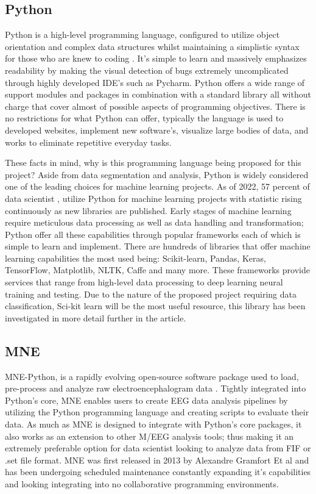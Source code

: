 \documentclass[12pt]{article}
\begin{document}
\subsection{Python}
Python is a high-level programming language, configured to utilize object orientation and complex data structures whilst maintaining a simplistic syntax for those who are knew to coding \cite{van1995python}. It's simple to learn and massively emphasizes readability by making the visual detection of bugs extremely uncomplicated through highly developed IDE's such as Pycharm. Python offers a wide range of support modules and packages in combination with a standard library all without charge that cover almost of possible aspects of programming objectives. There is no restrictions for what Python can offer, typically the language is used to developed websites, implement new software's, visualize large bodies of data, and works to eliminate repetitive everyday tasks. 

These facts in mind, why is this programming language being proposed for this project? Aside from data segmentation and analysis, Python is widely considered one of the leading choices for machine learning projects. As of 2022, 57 percent of data scientist \cite{coursera_2021}, utilize Python for machine learning projects with statistic rising continuously as new libraries are published. Early stages of machine learning require meticulous data processing as well as data handling and transformation; Python offer all these capabilities through popular frameworks each of which is simple to learn and implement. There are hundreds of libraries that offer machine learning capabilities the most used being: Scikit-learn, Pandas, Keras, TensorFlow, Matplotlib, NLTK, Caffe and many more. These frameworks provide services that range from high-level data processing to deep learning neural training and testing. Due to the nature of the proposed project requiring data classification, Sci-kit learn will be the most useful resource, this library has been investigated in more detail further in the article.

\subsection{MNE}
MNE-Python, is a rapidly evolving open-source software package used to load, pre-process and analyze raw electroencephalogram data \cite{GramfortEtAl2013a}. Tightly integrated into Python's core, MNE enables users to create EEG data analysis pipelines by utilizing the Python programming language and creating scripts to evaluate their data. As much as MNE is designed to integrate with Python's core packages, it also works as an extension to other M/EEG analysis tools; thus making it an extremely preferable option for data scientist looking to analyze data from FIF or .set file format. MNE was first released in 2013 by Alexandre Gramfort Et al \cite{GramfortEtAl2013a} and has been undergoing scheduled maintenance constantly expanding it's capabilities and looking integrating into no collaborative programming environments.
\end{document}
